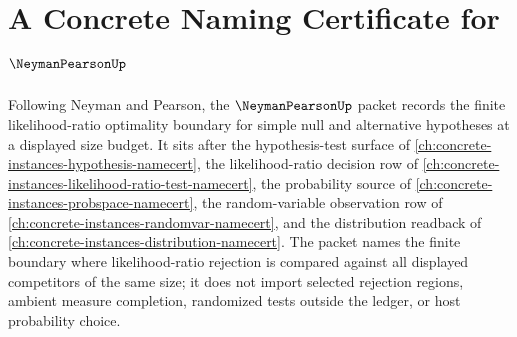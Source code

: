 \chapter{A Concrete Naming Certificate for $\NeymanPearsonUp$}
\label{ch:concrete-instances-neyman-pearson-namecert}

Following Neyman and Pearson, the $\NeymanPearsonUp$ packet records the finite likelihood-ratio optimality boundary for simple null and alternative hypotheses at a displayed size budget. It sits after the hypothesis-test surface of \autoref{ch:concrete-instances-hypothesis-namecert}, the likelihood-ratio decision row of \autoref{ch:concrete-instances-likelihood-ratio-test-namecert}, the probability source of \autoref{ch:concrete-instances-probspace-namecert}, the random-variable observation row of \autoref{ch:concrete-instances-randomvar-namecert}, and the distribution readback of \autoref{ch:concrete-instances-distribution-namecert}. The packet names the finite boundary where likelihood-ratio rejection is compared against all displayed competitors of the same size; it does not import selected rejection regions, ambient measure completion, randomized tests outside the ledger, or host probability choice.

